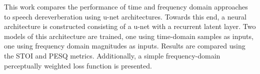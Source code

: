 This work compares the performance of time and frequency domain approaches to speech dereverberation using u-net architectures. Towards this end, a neural architecture is constructed consisting of a u-net with a recurrent latent layer. Two models of this architecture are trained, one using time-domain samples as inputs, one using frequency domain magnitudes as inputs. Results are compared using the \ac{STOI} and \ac{PESQ} metrics. Additionally, a simple frequency-domain perceptually weighted loss function is presented.
